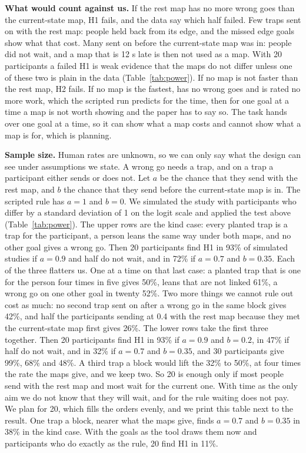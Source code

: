 \documentclass[pdflatex,sn-mathphys-num]{sn-jnl}
\begin{document}
\textbf{What would count against us.} If the rest map has no more wrong goes than the current-state map, H1
fails, and the data say which half failed. Few traps sent on with the rest map: people held back from its edge,
and the missed edge goals show what that cost. Many sent on before the current-state map was in: people did not
wait, and a map that is 12 s late is then not used as a map. With 20 participants a failed H1 is weak evidence
that the maps do not differ unless one of these two is plain in the data (Table~\ref{tab:power}). If no map is
not faster than the rest map, H2 fails. If no map is the fastest, has no wrong goes and is rated no more work,
which the scripted run predicts for the time, then for one goal at a time a map is not worth showing and the
paper has to say so. The task hands over one goal at a time, so it can show what a map costs and cannot show
what a map is for, which is planning.

\textbf{Sample size.} Human rates are unknown, so we can only say what the design can see under assumptions we
state. A wrong go needs a trap, and on a trap a participant either sends or does not. Let $a$ be the chance that
they send with the rest map, and $b$ the chance that they send before the current-state map is in. The scripted
rule has $a=1$ and $b=0$. We simulated the study with participants who differ by a standard deviation of 1 on the
logit scale and applied the test above (Table~\ref{tab:power}). The upper rows are the kind case: every planted
trap is a trap for the participant, a person leans the same way under both maps, and no other goal gives a wrong
go. Then 20 participants find H1 in 93\% of simulated studies if $a=0.9$ and half do not wait, and in 72\% if
$a=0.7$ and $b=0.35$. Each of the three flatters us. One at a time on that last case: a planted trap that is one
for the person four times in five gives 50\%, leans that are not linked 61\%, a wrong go on one other goal in
twenty 52\%. Two more things we cannot rule out cost as much: no second trap sent on after a wrong go in the same
block gives 42\%, and half the participants sending at 0.4 with the rest map because they met the current-state
map first gives 26\%. The lower rows take the first three together. Then 20 participants find H1 in 93\% if
$a=0.9$ and $b=0.2$, in 47\% if half do not wait, and in 32\% if $a=0.7$ and $b=0.35$, and 30 participants give
99\%, 68\% and 48\%. A third trap a block would lift the 32\% to 50\%, at four times the rate the maps give, and
we keep two. So 20 is enough only if most people send with the rest map and most wait for the current one. With
time as the only aim we do not know that they will wait, and for the rule waiting does not pay. We plan for 20,
which fills the orders evenly, and we print this table next to the result. One trap a block, nearer what the
maps give, finds $a=0.7$ and $b=0.35$ in 38\% in the kind case. With the goals as the tool draws them now and
participants who do exactly as the rule, 20 find H1 in 11\%. %
\end{document}
